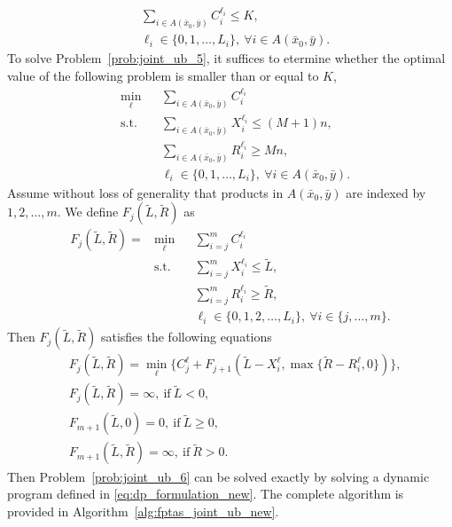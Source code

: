 \documentclass[mnsc,non-blindrev]{informs3}
\theoremstyle{definition}
\begin{document}
\begin{appendices}{\Large{}}
{\begin{equation}
\begin{aligned}
&\sum_{i\in A(\bar{x}_0,\bar{y})} C_i^{\ell_i}\leq K,\\
&\ell_i\in \{0,1,\dots,L_i\},\ \forall i\in A(\bar{x}_0,\bar{y}).
\end{aligned}
\end{equation}
To solve Problem~\eqref{prob:joint_ub_5}, it suffices to etermine whether the optimal value of the following problem is smaller than or equal to $K$,
\begin{equation}\label{prob:joint_ub_6}
\begin{aligned}
&\min_{\bm{\ell}}&&\sum_{i\in A(\bar{x}_0,\bar{y})} C_i^{\ell_i}\\
&\text{s.t.}&&\sum_{i\in A(\bar{x}_0,\bar{y})}X_i^{\ell_i}\leq (M+1)n,\\
&&&\sum_{i\in A(\bar{x}_0,\bar{y})} R_i^{\ell_i}\geq Mn,\\
&&&\ell_i\in \{0,1,\dots,L_i\},\ \forall i\in A(\bar{x}_0,\bar{y}).
\end{aligned}
\end{equation}
Assume without loss of generality that products in $A(\bar{x}_0,\bar{y})$ are indexed by $1,2,\dots,m$. We define $F_{j}(\tilde{L},\tilde{R})$ as
\begin{equation*}
\begin{aligned}
F_j(\tilde{L},\tilde{R})=&\min_{\bm{\ell}}&&\sum_{i=j}^m C_i^{\ell_i}\\
&\text{s.t.}&&\sum_{i=j}^m X_{i}^{\ell_i}\leq \tilde{L},\\
&&&\sum_{i=j}^m R_i^{\ell_i}\geq \tilde{R},\\
&&&\ell_i\in\{0,1,2,\dots,L_i\},\ \forall i\in\{j,\dots,m\}.
\end{aligned}
\end{equation*}
Then $F_j(\tilde{L},\tilde{R})$ satisfies the following equations
\begin{equation}\label{eq:dp_formulation_new}
\begin{aligned}
&F_j(\tilde{L},\tilde{R})=\min_{\ell}\Big\{C_j^{\ell}+F_{j+1}(\tilde{L}-X_i^\ell,\max\{\tilde{R}-R_i^\ell,0\})\Big\},\\
&F_{j}(\tilde{L},\tilde{R})=\infty,\ \text{if}\ \tilde{L}<0,\\
&F_{m+1}(\tilde{L},0)=0,\ \text{if}\ \tilde{L}\geq 0,\\
&F_{m+1}(\tilde{L},\tilde{R})=\infty,\ \text{if}\ \tilde{R}>0.
\end{aligned}
\end{equation}
Then Problem~\eqref{prob:joint_ub_6} can be solved exactly by solving a dynamic program defined in \eqref{eq:dp_formulation_new}. The complete algorithm is provided in Algorithm~\ref{alg:fptas_joint_ub_new}.

}
\end{appendices}
\end{document}
